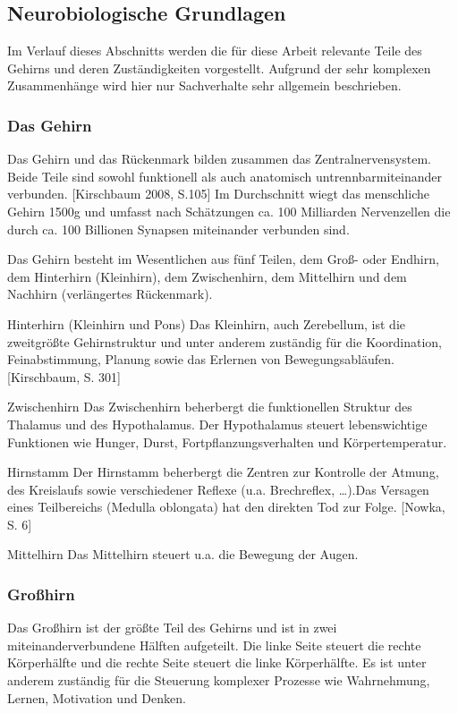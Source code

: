\subsection{Neurobiologische Grundlagen}
Im Verlauf dieses Abschnitts werden die für diese Arbeit relevante Teile des Gehirns und deren Zuständigkeiten vorgestellt. Aufgrund der sehr komplexen Zusammenhänge wird hier nur Sachverhalte sehr allgemein beschrieben. 

\subsubsection{Das Gehirn}
Das Gehirn und das Rückenmark bilden zusammen das Zentralnervensystem. Beide Teile sind \glqq sowohl funktionell als auch anatomisch untrennbar\grqq miteinander verbunden. [Kirschbaum 2008, S.105] Im Durchschnitt wiegt das menschliche Gehirn 1500g und umfasst nach Schätzungen  ca. 100 Milliarden Nervenzellen die durch ca. 100 Billionen Synapsen miteinander verbunden sind.

Das Gehirn besteht im Wesentlichen aus fünf Teilen, dem Groß- oder Endhirn, dem Hinterhirn (Kleinhirn), dem Zwischenhirn, dem Mittelhirn und dem Nachhirn (verlängertes Rückenmark).

Hinterhirn (Kleinhirn und Pons)
Das Kleinhirn, auch Zerebellum, ist die zweitgrößte Gehirnstruktur und unter anderem zuständig für die \glqq Koordination, Feinabstimmung, Planung sowie das Erlernen von Bewegungsabläufen\grqq. [Kirschbaum, S. 301]

Zwischenhirn
Das Zwischenhirn beherbergt die funktionellen Struktur des Thalamus und des Hypothalamus. Der Hypothalamus steuert \glqq lebenswichtige Funktionen wie Hunger, Durst, Fortpflanzungsverhalten und Körpertemperatur.\grqq [Kirschbaum, S. 305]

Hirnstamm
Der Hirnstamm beherbergt die \glqq Zentren zur Kontrolle der Atmung, des Kreislaufs sowie verschiedener Reflexe (u.a. Brechreflex, …).\grqq [Kirschbaum, S. 127] Das Versagen eines Teilbereichs (Medulla oblongata) hat den direkten Tod zur Folge. [Nowka, S. 6]

Mittelhirn
Das Mittelhirn steuert u.a. die Bewegung der Augen.

\subsubsection{Großhirn}
Das Großhirn ist der größte Teil des Gehirns und ist in zwei miteinanderverbundene Hälften aufgeteilt. Die linke Seite steuert die rechte Körperhälfte und die rechte Seite steuert die linke Körperhälfte. Es ist unter anderem zuständig für die \glqq Steuerung komplexer Prozesse wie Wahrnehmung, Lernen, Motivation und Denken.\grqq [Kirschbaum, S.115 ]

